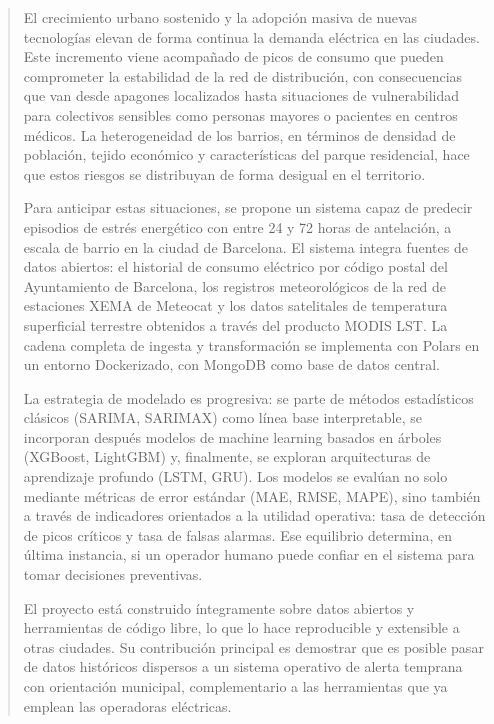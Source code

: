 \documentclass[12pt, a4paper]{article}
\begin{document}
\begin{abstract}
El crecimiento urbano sostenido y la adopción masiva de nuevas tecnologías elevan de forma continua la demanda eléctrica en las ciudades. Este incremento viene acompañado de picos de consumo que pueden comprometer la estabilidad de la red de distribución, con consecuencias que van desde apagones localizados hasta situaciones de vulnerabilidad para colectivos sensibles como personas mayores o pacientes en centros médicos. La heterogeneidad de los barrios, en términos de densidad de población, tejido económico y características del parque residencial, hace que estos riesgos se distribuyan de forma desigual en el territorio.

Para anticipar estas situaciones, se propone un sistema capaz de predecir episodios de estrés energético con entre 24 y 72 horas de antelación, a escala de barrio en la ciudad de Barcelona. El sistema integra fuentes de datos abiertos: el historial de consumo eléctrico por código postal del Ayuntamiento de Barcelona, los registros meteorológicos de la red de estaciones XEMA de Meteocat y los datos satelitales de temperatura superficial terrestre obtenidos a través del producto MODIS LST. La cadena completa de ingesta y transformación se implementa con Polars en un entorno Dockerizado, con MongoDB como base de datos central.

La estrategia de modelado es progresiva: se parte de métodos estadísticos clásicos (SARIMA, SARIMAX) como línea base interpretable, se incorporan después modelos de machine learning basados en árboles (XGBoost, LightGBM) y, finalmente, se exploran arquitecturas de aprendizaje profundo (LSTM, GRU). Los modelos se evalúan no solo mediante métricas de error estándar (MAE, RMSE, MAPE), sino también a través de indicadores orientados a la utilidad operativa: tasa de detección de picos críticos y tasa de falsas alarmas. Ese equilibrio determina, en última instancia, si un operador humano puede confiar en el sistema para tomar decisiones preventivas.

El proyecto está construido íntegramente sobre datos abiertos y herramientas de código libre, lo que lo hace reproducible y extensible a otras ciudades. Su contribución principal es demostrar que es posible pasar de datos históricos dispersos a un sistema operativo de alerta temprana con orientación municipal, complementario a las herramientas que ya emplean las operadoras eléctricas.
\end{abstract}
\end{document}
